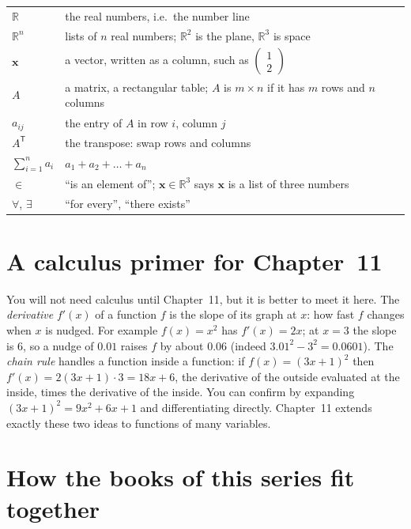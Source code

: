 \begin{center}
\begin{tabular}{lP{9.2cm}}
\toprule
{} & \\
\midrule
$\mathbb R$ & the real numbers, i.e.\ the number line\\
$\mathbb R^{n}$ & lists of $n$ real numbers; $\mathbb R^{2}$ is the plane, $\mathbb R^{3}$ is space\\
$\mathbf x$ & a vector, written as a column, such as $\begin{pmatrix}1\\2\end{pmatrix}$\\
$A$ & a matrix, a rectangular table; $A$ is $m\times n$ if it has $m$ rows and $n$ columns\\
$a_{ij}$ & the entry of $A$ in row $i$, column $j$\\
$A^{\mathsf T}$ & the transpose: swap rows and columns\\
$\sum_{i=1}^{n}a_i$ & $a_1+a_2+\dots+a_n$\\
$\in$ & ``is an element of''; $\mathbf x\in\mathbb R^{3}$ says $\mathbf x$ is a list of three numbers\\
$\forall$, $\exists$ & ``for every'', ``there exists''\\
\bottomrule
\end{tabular}
\end{center}

\section*{A calculus primer for Chapter~11}

You will not need calculus until Chapter~11, but it is better to meet it here.
The \emph{derivative} $f'(x)$ of a function $f$ is the slope of its graph at $x$:
how fast $f$ changes when $x$ is nudged. For example $f(x)=x^2$ has $f'(x)=2x$;
at $x=3$ the slope is $6$, so a nudge of $0.01$ raises $f$ by about $0.06$
(indeed $3.01^2-3^2=0.0601$). The \emph{chain rule} handles a function inside a
function: if $f(x)=(3x+1)^2$ then $f'(x)=2(3x+1)\cdot 3=18x+6$, the derivative of
the outside evaluated at the inside, times the derivative of the inside. You can
confirm by expanding $(3x+1)^2=9x^2+6x+1$ and differentiating directly.
Chapter~11 extends exactly these two ideas to functions of many variables.

\section*{How the books of this series fit together}


